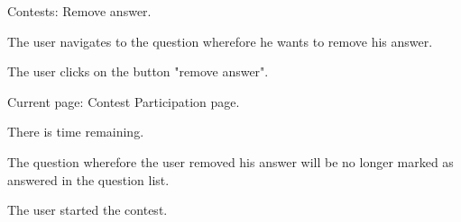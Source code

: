 \begin{uc}{Contests: Remove answer.}

    \begin{uc-mss}
    \item The user navigates to the question wherefore he wants to remove his answer. 
    \item The user clicks on the button "remove answer". 
    \end{uc-mss}

    \begin{uc-pre}
    \item Current page: Contest Participation page.
    \item There is time remaining. 
    \end{uc-pre}

    \begin{uc-post}
    \item The question wherefore the user removed his answer will be no longer marked as answered in the question list. 
    \end{uc-post}

    \begin{uc-trig}
    The user started the contest. 
    \end{uc-trig}

\end{uc}

